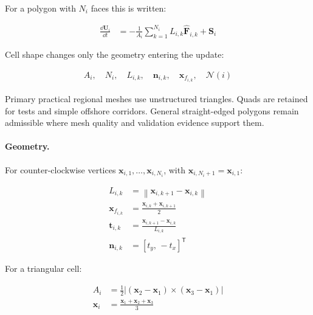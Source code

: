 For a polygon with $N_i$ faces this is written:

\begin{align}
  \frac{\dd\mathbf{U}_i}{\dd t}
  &=
  -
  \frac{1}{A_i}
  \sum_{k=1}^{N_i}
  L_{i,k}
  \widehat{\mathbf{F}}_{i,k}
  +
  \mathbf{S}_i
  \label{eq:res-num-spec-regional-polygon-update}
\end{align}

Cell shape changes only the geometry entering the update:

\begin{align}
  A_i,\quad
  N_i,\quad
  L_{i,k},\quad
  \mathbf{n}_{i,k},\quad
  \mathbf{x}_{f_{i,k}},\quad
  \mathcal{N}(i)
  \label{eq:res-num-spec-regional-cell-geometry-set}
\end{align}

Primary practical regional meshes use unstructured triangles. Quads are
retained for tests and simple offshore corridors. General straight-edged
polygons remain admissible where mesh quality and validation evidence
support them.

\paragraph{Geometry.}
\label{sec:res-num-spec-regional-geometry}

For counter-clockwise vertices
$\mathbf{x}_{i,1},\ldots,\mathbf{x}_{i,N_i}$, with
$\mathbf{x}_{i,N_i+1}=\mathbf{x}_{i,1}$:

\begin{align}
  L_{i,k}
  &=
  \left\|
    \mathbf{x}_{i,k+1}
    -
    \mathbf{x}_{i,k}
  \right\|
  \label{eq:res-num-spec-regional-face-length}
  \\
  \mathbf{x}_{f_{i,k}}
  &=
  \frac{
    \mathbf{x}_{i,k}
    +
    \mathbf{x}_{i,k+1}
  }{2}
  \label{eq:res-num-spec-regional-face-centroid}
  \\
  \mathbf{t}_{i,k}
  &=
  \frac{
    \mathbf{x}_{i,k+1}
    -
    \mathbf{x}_{i,k}
  }{L_{i,k}}
  \label{eq:res-num-spec-regional-face-tangent}
  \\
  \mathbf{n}_{i,k}
  &=
  \left[
    t_y,\,
    -t_x
  \right]^{\mathsf{T}}
  \label{eq:res-num-spec-regional-face-normal}
\end{align}

For a triangular cell:

\begin{align}
  A_i
  &=
  \frac{1}{2}
  \left|
    \left(
      \mathbf{x}_2-\mathbf{x}_1
    \right)
    \times
    \left(
      \mathbf{x}_3-\mathbf{x}_1
    \right)
  \right|
  \label{eq:res-num-spec-regional-triangle-area}
  \\
  \mathbf{x}_i
  &=
  \frac{
    \mathbf{x}_1
    +
    \mathbf{x}_2
    +
    \mathbf{x}_3
  }{3}
  \label{eq:res-num-spec-regional-triangle-centroid}
\end{align}

